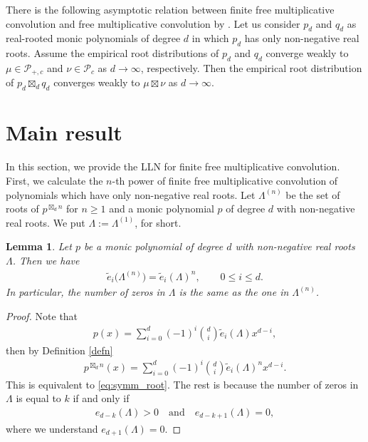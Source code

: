 \documentclass[pdftex]{sigma}
\newtheorem{Lemma}[Theorem]{Lemma}
\numberwithin{equation}{section}
\newcommand{\calP}{\mathcal{P}}
\begin{document}
There is the following asymptotic relation between finite free multiplicative convolution and free multiplicative convolution by \cite[Theorem 1.4]{AVP21}.
Let us consider $p_d$ and $q_d$ as real-rooted monic polynomials of degree $d$ in which $p_d$ has only non-negative real roots. Assume the empirical root distributions of $p_d$ and $q_d$ converge weakly to $\mu\in \calP_{+,c}$ and $\nu\in \calP_c$ as $d\rightarrow\infty$, respectively. Then the empirical root distribution of $p_d \boxtimes_d q_d$ converges weakly to $\mu\boxtimes \nu$ as $d\rightarrow\infty$.



\section{Main result}\label{section3}

In this section, we provide the LLN for finite free multiplicative convolution. First, we calculate the $n$-th power of finite free multiplicative convolution of polynomials which have only non-negative real roots. Let $\Lambda^{(n)}$ be the set of roots of $p^{\boxtimes_d n}$ for $n \ge1$ and a monic polynomial $p$ of degree $d$ with non-negative real roots.
We put $\Lambda := \Lambda^{(1)}$, for short.


\begin{Lemma}\label{lem:free_multiplicative_polynomial}
Let $p$ be a monic polynomial of degree $d$ with non-negative real roots $\Lambda$. Then we have
\begin{align} \label{eq:symm_root}
\widetilde{e}_{i}\big(\Lambda^{(n)}\big)= \widetilde{e}_{i}(\Lambda)^n, \qquad 0\le i \le d.
\end{align}
In particular, the number of zeros in $\Lambda$ is the same as the one in $\Lambda^{(n)}$.
\end{Lemma}

\begin{proof}
Note that
\begin{align*}
p(x)= \sum_{i=0}^{d} (-1)^i \binom{d}{i} \widetilde{e}_i(\Lambda) x^{d-i},
\end{align*}
then by Definition \ref{defn}
\begin{align*}
p^{\boxtimes_d n}(x)= \sum_{i=0}^d (-1)^i \binom{d}{i} \widetilde{e}_i(\Lambda)^{n} x^{d-i}.
\end{align*}
This is equivalent to \eqref{eq:symm_root}.
The rest is because the number of zeros in $\Lambda$ is equal to $k$ if and only if
\begin{align*}
e_{d-k}(\Lambda) > 0 \quad \text{and} \quad e_{d-k+1}(\Lambda) = 0,
\end{align*}
where we understand $e_{d+1}(\Lambda) =0$.
\end{proof}
\end{document}

